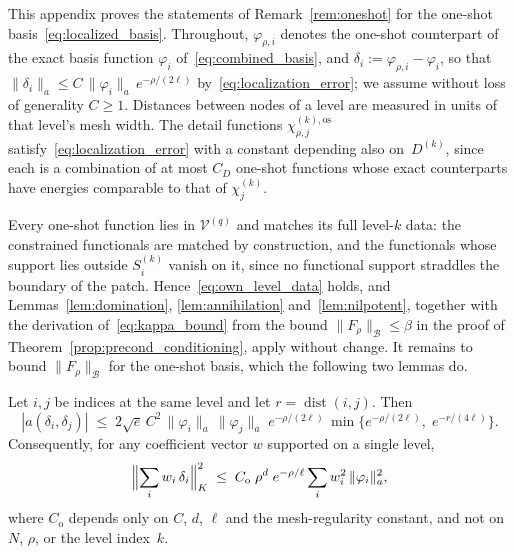 This appendix proves the statements of Remark~\ref{rem:oneshot} for the
one-shot basis~\eqref{eq:localized_basis}.  Throughout,
$\varphi_{\rho,i}$ denotes the one-shot counterpart of the exact basis
function $\varphi_i$ of~\eqref{eq:combined_basis}, and
$\delta_i := \varphi_{\rho,i} - \varphi_i$, so that
$\|\delta_i\|_a \leq C\,\|\varphi_i\|_a\,e^{-\rho/(2\ell)}$
by~\eqref{eq:localization_error}; we assume without loss of generality
$C \geq 1$.  Distances between nodes of a level are measured in units
of that level's mesh width.  The detail functions
$\chi^{(k),\mathrm{os}}_{\rho,j}$ satisfy~\eqref{eq:localization_error}
with a constant depending also on~$D^{(k)}$, since each is a combination
of at most $C_D$ one-shot functions whose exact counterparts have
energies comparable to that of $\chi^{(k)}_j$.

Every one-shot function lies in $\mathcal{V}^{(q)}$ and matches its
full level-$k$ data: the constrained functionals are matched by
construction, and the functionals whose support lies outside
$S^{(k)}_i$ vanish on it, since no functional support straddles the
boundary of the patch.  Hence~\eqref{eq:own_level_data} holds, and
Lemmas~\ref{lem:domination}, \ref{lem:annihilation}
and~\ref{lem:nilpotent}, together with the derivation
of~\eqref{eq:kappa_bound} from the bound $\|F_\rho\|_{\mathcal{B}} \leq \beta$ in
the proof of Theorem~\ref{prop:precond_conditioning}, apply without
change.  It remains to bound $\|F_\rho\|_{\mathcal{B}}$ for the one-shot basis,
which the following two lemmas do.

\begin{lemma}\label{lem:error_interactions}
Let $i, j$ be indices at the same level and let
$r = \operatorname{dist}(i,j)$.  Then
\begin{equation}\label{eq:error_interaction}
  |a(\delta_i, \delta_j)|
  \;\leq\;
  2\sqrt{e}\,C^2\,\|\varphi_i\|_a\,\|\varphi_j\|_a\;
  e^{-\rho/(2\ell)}\,
  \min\bigl\{e^{-\rho/(2\ell)},\; e^{-r/(4\ell)}\bigr\}.
\end{equation}
Consequently, for any coefficient vector $w$ supported on a single level,
\begin{equation}\label{eq:almost_orth}
  \Bigl\|\sum_i w_i\,\delta_i\Bigr\|_K^2
  \;\leq\;
  C_{\mathrm{o}}\;\rho^d\;e^{-\rho/\ell}
  \sum_i w_i^2\,\|\varphi_i\|_a^2,
\end{equation}
where $C_{\mathrm{o}}$ depends only on $C$, $d$, $\ell$ and the
mesh-regularity constant, and not on $N$, $\rho$, or the level index~$k$.
\end{lemma}

